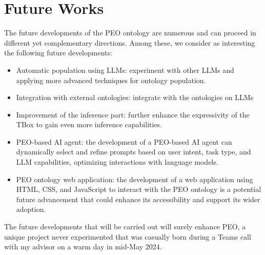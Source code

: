 \section{Future Works}
\label{section:6_2_future}
The future developments of the PEO ontology are numerous and can proceed in different yet complementary directions. 
Among these, we consider as interesting the following future developments:
\begin{itemize}
    \item Automatic population using LLMs: experiment with other LLMs and applying more advanced techniques for ontology population.
   
    \item Integration with external ontologies: integrate with the ontologies on LLMs 

    \item Improvement of the inference part: further enhance the expressivity of the TBox to gain even more inference capabilities.


    \item PEO-based AI agent: the development of a PEO-based AI agent can dynamically select and refine prompts based on user intent, task type, and LLM capabilities, optimizing interactions with language models. 
    
 
    \item PEO ontology web application: the development of a web application using HTML, CSS, and JavaScript to interact with the PEO ontology is a potential future advancement that could enhance its accessibility and support its wider adoption. 
\end{itemize}
The future developments that will be carried out will surely enhance PEO, a unique project never experimented that was casually born during a Teams call with my advisor on a warm day in mid-May 2024.
